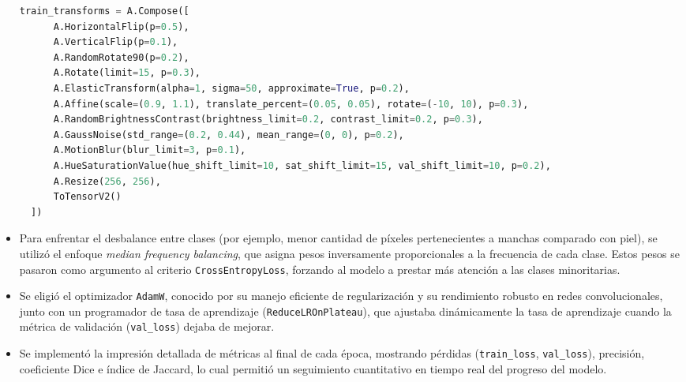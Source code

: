 \begin{itemize}
\begin{lstlisting}[language=Python]
  train_transforms = A.Compose([
      A.HorizontalFlip(p=0.5),
      A.VerticalFlip(p=0.1),
      A.RandomRotate90(p=0.2),
      A.Rotate(limit=15, p=0.3),
      A.ElasticTransform(alpha=1, sigma=50, approximate=True, p=0.2),
      A.Affine(scale=(0.9, 1.1), translate_percent=(0.05, 0.05), rotate=(-10, 10), p=0.3),
      A.RandomBrightnessContrast(brightness_limit=0.2, contrast_limit=0.2, p=0.3),
      A.GaussNoise(std_range=(0.2, 0.44), mean_range=(0, 0), p=0.2),
      A.MotionBlur(blur_limit=3, p=0.1),
      A.HueSaturationValue(hue_shift_limit=10, sat_shift_limit=15, val_shift_limit=10, p=0.2),
      A.Resize(256, 256),
      ToTensorV2()
  ])
  \end{lstlisting}

\item Para enfrentar el desbalance entre clases (por ejemplo, menor cantidad de píxeles pertenecientes a manchas comparado con piel), se utilizó el enfoque \emph{median frequency balancing}, que asigna pesos inversamente proporcionales a la frecuencia de cada clase. Estos pesos se pasaron como argumento al criterio \texttt{CrossEntropyLoss}, forzando al modelo a prestar más atención a las clases minoritarias.

\item Se eligió el optimizador \texttt{AdamW}, conocido por su manejo eficiente de regularización y su rendimiento robusto en redes convolucionales, junto con un programador de tasa de aprendizaje (\texttt{ReduceLROnPlateau}), que ajustaba dinámicamente la tasa de aprendizaje cuando la métrica de validación (\texttt{val\_loss}) dejaba de mejorar.

\item Se implementó la impresión detallada de métricas al final de cada época, mostrando pérdidas (\texttt{train\_loss}, \texttt{val\_loss}), precisión, coeficiente Dice e índice de Jaccard, lo cual permitió un seguimiento cuantitativo en tiempo real del progreso del modelo.
\end{itemize}




